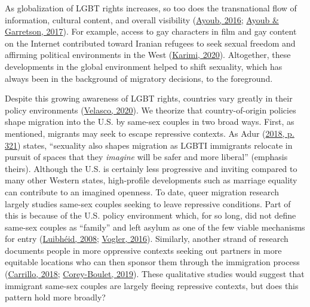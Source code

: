\documentclass[
  11pt,
]{article}
\begin{document}
As globalization of LGBT rights increases, so too does the transnational flow of information, cultural content, and overall visibility (\protect\hyperlink{ref-ayoub_2016}{Ayoub, 2016}; \protect\hyperlink{ref-ayoub_2017}{Ayoub \& Garretson, 2017}). For example, access to gay characters in film and gay content on the Internet contributed toward Iranian refugees to seek sexual freedom and affirming political environments in the West (\protect\hyperlink{ref-karimi_2020}{Karimi, 2020}). Altogether, these developments in the global environment helped to shift sexuality, which has always been in the background of migratory decisions, to the foreground.

Despite this growing awareness of LGBT rights, countries vary greatly in their policy environments (\protect\hyperlink{ref-velasco_2020}{Velasco, 2020}). We theorize that country-of-origin policies shape migration into the U.S. by same-sex couples in two broad ways. First, as mentioned, migrants may seek to escape repressive contexts. As Adur (\protect\hyperlink{ref-adur_2018}{2018, p. 321}) states, ``sexuality also shapes migration as LGBTI immigrants relocate in pursuit of spaces that they \emph{imagine} will be safer and more liberal'' (emphasis theirs). Although the U.S. is certainly less progressive and inviting compared to many other Western states, high-profile developments such as marriage equality can contribute to an imagined openness. To date, queer migration research largely studies same-sex couples seeking to leave repressive conditions. Part of this is because of the U.S. policy environment which, for so long, did not define same-sex couples as ``family'' and left asylum as one of the few viable mechanisms for entry (\protect\hyperlink{ref-luibheid_2008}{Luibhéid, 2008}; \protect\hyperlink{ref-vogler_2016}{Vogler, 2016}). Similarly, another strand of research documents people in more oppressive contexts seeking out partners in more equitable locations who can then sponsor them through the immigration process (\protect\hyperlink{ref-carrillo_2018}{Carrillo, 2018}; \protect\hyperlink{ref-corey-boulet_2019}{Corey-Boulet, 2019}). These qualitative studies would suggest that immigrant same-sex couples are largely fleeing repressive contexts, but does this pattern hold more broadly?
\end{document}
